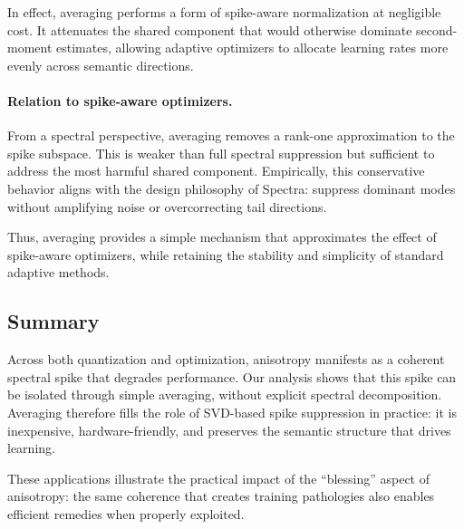 In effect, averaging performs a form of spike-aware normalization at negligible
cost.
It attenuates the shared component that would otherwise dominate second-moment
estimates, allowing adaptive optimizers to allocate learning rates more evenly
across semantic directions.

\paragraph{Relation to spike-aware optimizers.}
From a spectral perspective, averaging removes a rank-one approximation to the
spike subspace.
This is weaker than full spectral suppression but sufficient to address the most
harmful shared component.
Empirically, this conservative behavior aligns with the design philosophy of
Spectra: suppress dominant modes without amplifying noise or overcorrecting
tail directions.

Thus, averaging provides a simple mechanism that approximates the effect of
spike-aware optimizers, while retaining the stability and simplicity of standard
adaptive methods.

\subsection{Summary}

Across both quantization and optimization, anisotropy manifests as a coherent
spectral spike that degrades performance.
Our analysis shows that this spike can be isolated through simple averaging,
without explicit spectral decomposition.
Averaging therefore fills the role of SVD-based spike suppression in practice:
it is inexpensive, hardware-friendly, and preserves the semantic structure that
drives learning.

These applications illustrate the practical impact of the “blessing” aspect of
anisotropy: the same coherence that creates training pathologies also enables
efficient remedies when properly exploited.